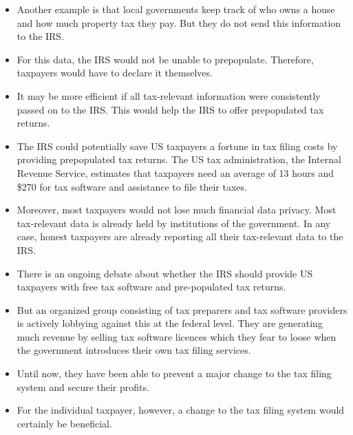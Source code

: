 \documentclass[11pt]{article}
\begin{document}
\begin{itemize}
    \item Another example is that local governments keep track of who owns a house and how much property tax they pay. But they do not send this information to the IRS. %
    \item For this data, the IRS would not be unable to prepopulate.  Therefore, taxpayers would have to declare it themselves.
    \item It may be more efficient if all tax-relevant information were consistently passed on to the IRS. This would help the IRS to offer prepopulated tax returns.
    \item The IRS could potentially save US taxpayers a fortune in tax filing costs by providing prepopulated tax returns. The US tax administration, the Internal Revenue Service, estimates that taxpayers need an average of 13 hours and \$270 for tax software and assistance to file their taxes.
    \item Moreover, most taxpayers would not lose much financial data privacy. Most tax-relevant data is already held by institutions of the government. In any case, honest taxpayers are already reporting all their tax-relevant data to the IRS. 
    \item There is an ongoing debate about whether the IRS should provide US taxpayers with free tax software and pre-populated tax returns. 
    \item But an organized group consisting of tax preparers and tax software providers is actively lobbying against this at the federal level. They are generating much revenue by selling tax software licences which they fear to loose when the government introduces their own tax filing services. 
   \item Until now, they have been able to prevent a major change to the tax filing system and secure their profits.
   \item For the individual taxpayer, however, a change to the tax filing system would certainly be beneficial.
\end{itemize}
\end{document}
